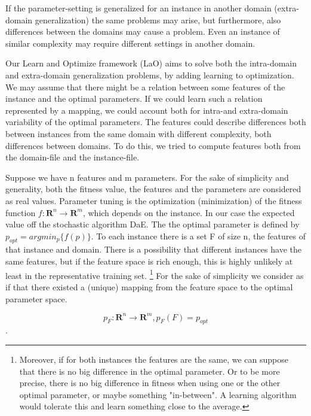 \documentclass{acm_proc_article-sp}
\begin{document}
If the parameter-setting is generalized for an instance in another domain (extra-domain generalization) the same problems may arise, but furthermore, also differences between the domains may cause a problem. Even an instance of similar complexity may require different settings in another domain.

Our Learn and Optimize framework (LaO) aims to solve both the intra-domain and extra-domain generalization problems, by adding learning to optimization. We may assume that there might be a relation between some features of the instance and the optimal parameters. If we could learn such a relation represented by a mapping, we could account both for intra-and extra-domain variability of the optimal parameters. The features could describe differences both between instances from the same domain with different complexity, both differences between domains. To do this, we tried to compute features both from the domain-file and the instance-file.

Suppose we have n features and m parameters. For the sake of simplicity and generality, both the fitness value, the features and the parameters are considered as real values. Parameter tuning is the optimization (minimization) of the fitness function \begin{math}f:\mathbf{R}^n\to \mathbf{R}^m \end{math}, which depends on the instance. In our case the expected value off the stochastic algorithm DaE. The the optimal parameter is defined by \begin{math} p_{opt}=argmin_p\{f(p)\} \end{math}. To each instance there is a set F of size n, the features of that instance and domain. There is a possibility that different instances have the same features, but if the feature space is rich enough, this is highly unlikely at least in the representative training set. \footnote{Moreover, if for both instances the features are the same, we can suppose that there is no big difference in the optimal parameter. Or to be more precise, there is no big difference in fitness when using one or the other optimal parameter, or maybe something "in-between". A learning algorithm would tolerate this and learn something close to the average.} For the sake of simplicity we consider as if that there existed a (unique) mapping from the feature space to the optimal parameter space.

\begin{equation} p_F: \mathbf{R}^n \to \mathbf{R}^m, p_F(F)=p_{opt} \end{equation}.	
\end{document}
